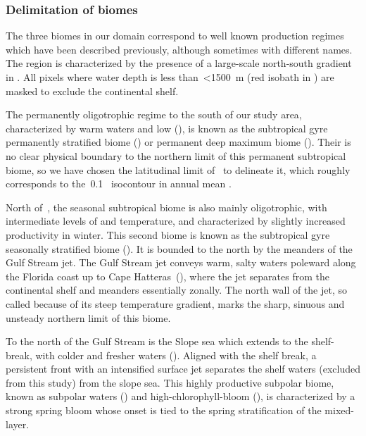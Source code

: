 \subsubsection{Delimitation of biomes}

The three biomes in our domain correspond to well known production regimes which have been described previously, although sometimes with different names.
The region is characterized by the presence of a large-scale north-south gradient in .
All pixels where water depth is less than~\qty{<1500}{\m} (red isobath in ) are masked to exclude the continental shelf.

The permanently oligotrophic regime to the south of our study area, characterized by warm waters and low  (), is known as the subtropical gyre permanently stratified biome (\cite{sarmiento_2004}) or permanent deep  maximum biome (\cite{bock_2022}).
Their is no clear physical boundary to the northern limit of this permanent subtropical biome, so we have chosen the latitudinal limit of~ to delineate it, which roughly corresponds to the~\qty{0.1}{\mgm}~ isocontour in annual mean .

North of~, the seasonal subtropical biome is also mainly oligotrophic, with intermediate levels of  and temperature, and characterized by slightly increased productivity in winter.
This second biome is known as the subtropical gyre seasonally stratified biome (\cite{sarmiento_2004}).
It is bounded to the north by the meanders of the Gulf Stream jet.
The Gulf Stream jet conveys warm, salty waters poleward along the Florida coast up to Cape Hatteras~(), where the jet separates from the continental shelf and meanders essentially zonally.
The north wall of the jet, so called because of its steep temperature gradient, marks the sharp, sinuous and unsteady northern limit of this biome.

To the north of the Gulf Stream is the Slope sea which extends to the shelf-break, with colder and fresher waters (\cite{linder_1998}).
Aligned with the shelf break, a persistent front with an intensified surface jet separates the shelf waters (excluded from this study) from the slope sea.
This highly productive subpolar biome, known as subpolar waters (\cite{sarmiento_2004}) and high-chlorophyll-bloom (\cite{bock_2022}), is characterized by a strong spring bloom whose onset is tied to the spring stratification of the mixed-layer.

